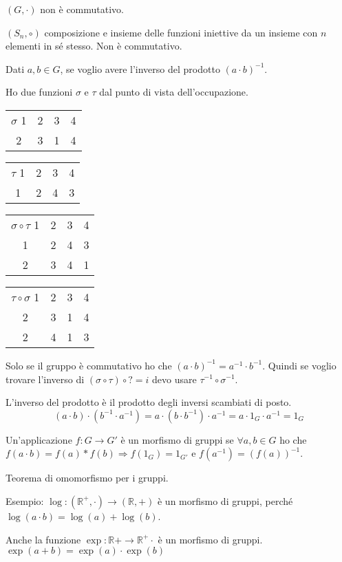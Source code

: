 $(G, \cdot)$ non \`e commutativo.

$(S_n, \circ)$ composizione e insieme delle funzioni iniettive da un insieme con $n$ elementi in s\'e stesso. Non \`e commutativo.

Dati $a, b \in G$, se voglio avere l'inverso del prodotto $(a \cdot b)^{-1}$.

Ho due funzioni $\sigma$ e $\tau$ dal punto di vista dell'occupazione.

\begin{tabular}{cccc}
$\sigma$
1 & 2 & 3 & 4 \\
2 & 3 & 1 & 4
\end{tabular}

\begin{tabular}{cccc}
$\tau$
1 & 2 & 3 & 4 \\
1 & 2 & 4 & 3
\end{tabular}

\begin{tabular}{cccc}
$\sigma \circ \tau$
1 & 2 & 3 & 4 \\
1 & 2 & 4 & 3 \\
2 & 3 & 4 & 1
\end{tabular}

\begin{tabular}{cccc}
$\tau \circ \sigma$
1 & 2 & 3 & 4 \\
2 & 3 & 1 & 4 \\
2 & 4 & 1 & 3
\end{tabular}

Solo se il gruppo \`e commutativo ho che $(a \cdot b)^{-1} = a^{-1} \cdot b^{-1}$. Quindi se voglio trovare l'inverso di $(\sigma \circ \tau) \circ ? = i$ devo usare $\tau^{-1} \circ \sigma^{-1}$.

L'inverso del prodotto \`e il prodotto degli inversi scambiati di posto.
\[
(a \cdot b) \cdot (b^{-1} \cdot a^{-1}) = a \cdot (b \cdot b^{-1}) 
\cdot a^{-1} = a \cdot 1_G \cdot a^{-1} = 1_G
\]

Un'applicazione $f : G \to G'$ \`e un morfismo di gruppi se $\forall a, b \in G$ ho che $f(a \cdot b) = f(a) \ast f(b) \Rightarrow f(1_G) = 1_{G'}$ e $f(a^{-1}) = (f(a))^{-1}$.

Teorema di omomorfismo per i gruppi.

Esempio: $\log : (\mathbb{R}^{+}, \cdot) \to (\mathbb{R}, +)$ \`e un morfismo di gruppi, perch\'e $\log(a \cdot b) = \log(a) + \log(b)$.

Anche la funzione $\exp : \mathbb{R} + \to \mathbb{R}^{+} \cdot$ \`e un morfismo di gruppi.  $\exp(a + b) = \exp(a) \cdot \exp(b)$

